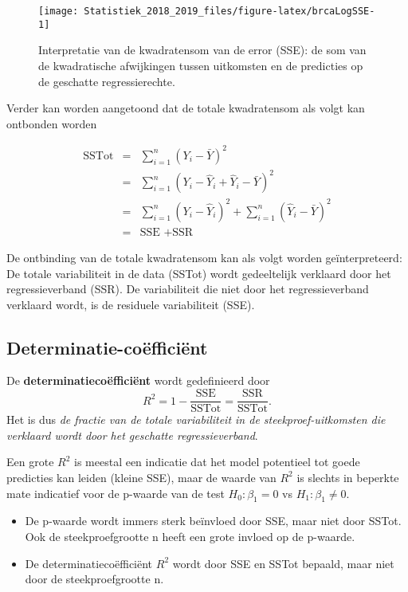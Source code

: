 \documentclass[12pt,dutch,coursenotes]{book}
\providecommand{\tightlist}{%
  \setlength{\itemsep}{0pt}\setlength{\parskip}{0pt}}
\theoremstyle{definition}
\theoremstyle{definition}
\theoremstyle{definition}
\theoremstyle{remark}
\begin{document}
\begin{figure}

{\centering \texttt{[image: Statistiek\_2018\_2019\_files/figure-latex/brcaLogSSE-1]} 

}

\caption{Interpretatie van de kwadratensom van de error (SSE): de som van de kwadratische afwijkingen tussen uitkomsten en de predicties op de geschatte regressierechte.}\label{fig:brcaLogSSE}
\end{figure}

Verder kan worden aangetoond dat de totale kwadratensom als volgt kan
ontbonden worden

\begin{eqnarray*}
  \text{SSTot} 
    &=&  \sum_{i=1}^n (Y_i-\bar{Y})^2 \\
    &=&  \sum_{i=1}^n (Y_i-\hat{Y}_i+\hat{Y}_i-\bar{Y})^2 \\
    &=&  \sum_{i=1}^n (Y_i-\hat{Y}_i)^2+\sum_{i=1}^n(\hat{Y}_i-\bar{Y})^2 \\
    &=&  \text{SSE }+\text{SSR}  
  \end{eqnarray*}

De ontbinding van de totale kwadratensom kan als volgt worden
geïnterpreteerd: De totale variabiliteit in de data (SSTot) wordt
gedeeltelijk verklaard door het regressieverband (SSR). De variabiliteit
die niet door het regressieverband verklaard wordt, is de residuele
variabiliteit (SSE).

\subsection{Determinatie-coëfficiënt}\label{determinatie-coefficient}

De \textbf{determinatiecoëfficiënt} wordt gedefinieerd door
\[ R^2 = 1-\frac{\text{SSE}}{\text{SSTot}}=\frac{\text{SSR}}{\text{SSTot}}.\]
Het is dus \emph{de fractie van de totale variabiliteit in de
steekproef-uitkomsten die verklaard wordt door het geschatte
regressieverband}.

Een grote \(R^2\) is meestal een indicatie dat het model potentieel tot
goede predicties kan leiden (kleine SSE), maar de waarde van \(R^2\) is
slechts in beperkte mate indicatief voor de p-waarde van de test
\(H_0:\beta_1=0\) vs \(H_1:\beta_1\neq0\).

\begin{itemize}
\tightlist
\item
  De p-waarde wordt immers sterk beïnvloed door SSE, maar niet door
  SSTot. Ook de steekproefgrootte n heeft een grote invloed op de
  p-waarde.
\item
  De determinatiecoëfficiënt \(R^2\) wordt door SSE en SSTot bepaald,
  maar niet door de steekproefgrootte n.
\end{itemize}
\end{document}
